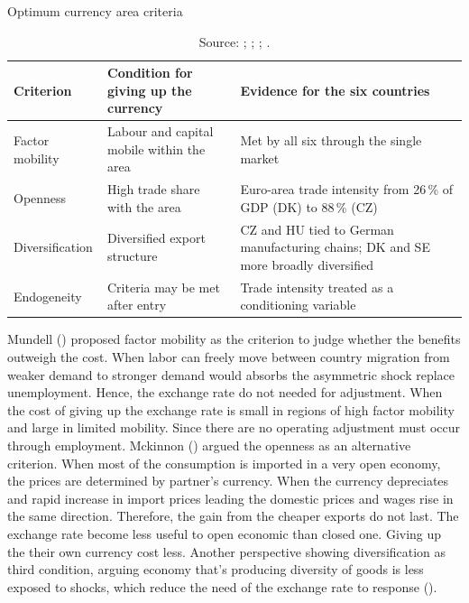 \FloatBarrier
\begin{table}[htbp]
\centering
\caption{Optimum currency area criteria}
\vspace{\baselineskip}
\label{tab:oca}
    \begin{tabular}{@{}L{2.6cm} L{5.0cm} L{5.0cm}@{}}
    \toprule
    \textbf{Criterion} &  \textbf{Condition for giving up the currency} & \textbf{Evidence for the six countries} \\
    \midrule
    Factor mobility & Labour and capital mobile within the area & Met by all six through the single market \\
    \addlinespace
    Openness &  High trade share with the area & Euro-area trade intensity from 26\,\% of GDP (DK) to 88\,\% (CZ) \\
        \addlinespace
    Diversification & Diversified export structure & CZ and HU tied to German manufacturing chains; DK and SE more broadly diversified \\
    \addlinespace
    Endogeneity  & Criteria may be met after entry & Trade intensity treated as a conditioning variable\\
    \bottomrule
    \end{tabular}
\vspace{\baselineskip}
\caption*{\footnotesize Source: \cite{mundell_theory_1961}; \cite{mckinnon_optimum_1963}; \cite{kenen_theory_1969}; \cite{frankel_endogeneity_1998}.}
\end{table}
\FloatBarrier
Mundell (\citeyear{mundell_theory_1961}) proposed factor mobility as the criterion to judge whether the benefits outweigh the cost.
When labor can freely move between country migration from weaker demand to stronger demand would absorbs the asymmetric shock replace unemployment.
Hence, the exchange rate do not needed for adjustment.
When the cost of giving up the exchange rate is small in regions of high factor mobility and large in limited mobility.
Since there are no operating adjustment must occur through employment.
Mckinnon (\citeyear{mckinnon_optimum_1963}) argued the openness as an alternative criterion. 
When most of the consumption is imported in a very open economy, the prices are determined by partner's currency.
When the currency depreciates and rapid increase in import prices leading the domestic prices and wages rise in the same direction.
Therefore, the gain from the cheaper exports do not last.
The exchange rate become less useful to open economic than closed one. Giving up the their own currency cost less.
Another perspective showing diversification as third condition, arguing economy that's producing diversity of goods is less exposed to shocks, which reduce the need of the exchange rate to response (\cite{kenen_theory_1969}).

